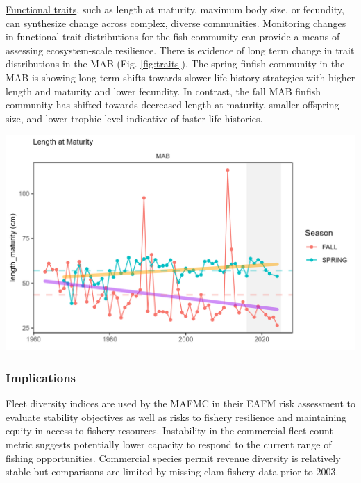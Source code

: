 \documentclass[
  10pt,
]{article}
\let\origfigure\figure
\let\endorigfigure\endfigure
\renewenvironment{figure}[1][2] {
    \expandafter\origfigure\expandafter[H]
} {
    \endorigfigure
}
\begin{document}
\href{https://noaa-edab.github.io/catalog/finfish_traits.html}{Functional traits}, such as length at maturity, maximum body size, or fecundity, can synthesize change across complex, diverse communities. Monitoring changes in functional trait distributions for the fish community can provide a means of assessing ecosystem-scale resilience. There is evidence of long term change in trait distributions in the MAB (Fig. \ref{fig:traits}). The spring finfish community in the MAB is showing long-term shifts towards slower life history strategies with higher length and maturity and lower fecundity. In contrast, the fall MAB finfish community has shifted towards decreased length at maturity, smaller offspring size, and lower trophic level indicative of faster life histories.

\begin{figure}

{\centering \includegraphics[width=6.5in]{images/MidAtlantic/traits_MidAtlantic_2025-09-05} 

}

\caption{Fish community functional traits in the Mid Atlantic Bight based on Fall (red) and Spring (blue) survey data. Length at maturity for the full finfish community has increased in spring (orange line), but decreased in fall (purple lines)}\label{fig:traits}
\end{figure}

\subsubsection{Implications}\label{implications-3}

Fleet diversity indices are used by the MAFMC in their EAFM risk assessment to evaluate stability objectives as well as risks to fishery resilience and maintaining equity in access to fishery resources. Instability in the commercial fleet count metric suggests potentially lower capacity to respond to the current range of fishing opportunities. Commercial species permit revenue diversity is relatively stable but comparisons are limited by missing clam fishery data prior to 2003.
\end{document}
